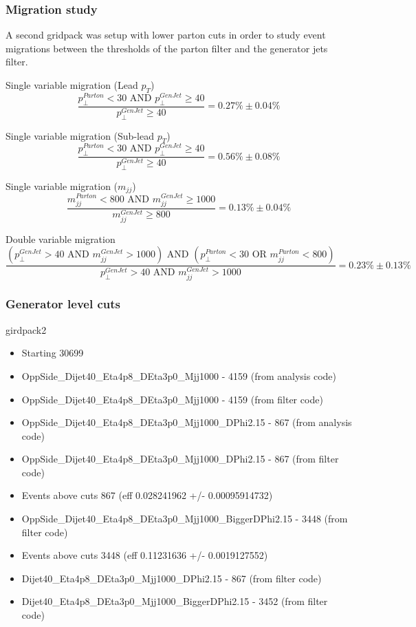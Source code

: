 \subsubsection{Migration study}

A second gridpack was setup with lower parton cuts in order to study event migrations between the thresholds of the parton filter and the generator jets filter.

Single variable migration (Lead $p_T$)
\begin{equation}
\frac{p_{\perp}^{Parton}<30 \text{ AND } p_{\perp}^{GenJet} \geq 40}{p_{\perp}^{GenJet} \geq 40}=0.27\% \pm 0.04\%
\end{equation}

Single variable migration (Sub-lead $p_T$)
\begin{equation}
\frac{p_{\perp}^{Parton}<30 \text{ AND } p_{\perp}^{GenJet} \geq 40}{p_{\perp}^{GenJet} \geq 40}=0.56\% \pm 0.08\%
\end{equation}

Single variable migration ($m_{jj}$)
\begin{equation}
\frac{m_{jj}^{Parton}<800 \text{ AND } m_{jj}^{GenJet} \geq 1000}{m_{jj}^{GenJet} \geq 800}=0.13\% \pm 0.04\%
\end{equation}

Double variable migration
\begin{equation}
\frac{(p_{\perp}^{GenJet}>40 \text{ AND } m_{jj}^{GenJet}>1000) \text{ AND } (p_{\perp}^{Parton}<30 \text{ OR } m_{jj}^{Parton}<800)}{p_{\perp}^{GenJet}>40 \text{ AND } m_{jj}^{GenJet}>1000} = 0.23\% \pm 0.13\%
\end{equation}

\subsubsection{Generator level cuts}

girdpack2
\begin{itemize}
  \item Starting 30699
  \item OppSide_Dijet40_Eta4p8_DEta3p0_Mjj1000          - 4159 (from analysis code)
  \item OppSide_Dijet40_Eta4p8_DEta3p0_Mjj1000          - 4159 (from filter code)
  \item OppSide_Dijet40_Eta4p8_DEta3p0_Mjj1000_DPhi2.15 - 867 (from analysis code)
  \item OppSide_Dijet40_Eta4p8_DEta3p0_Mjj1000_DPhi2.15 - 867 (from filter code)
  \item Events above cuts 867 (eff 0.028241962 +/- 0.00095914732)
  \item OppSide_Dijet40_Eta4p8_DEta3p0_Mjj1000_BiggerDPhi2.15 - 3448 (from filter code)
  \item Events above cuts 3448 (eff 0.11231636 +/- 0.0019127552)
  \item Dijet40_Eta4p8_DEta3p0_Mjj1000_DPhi2.15       - 867  (from filter code)
  \item Dijet40_Eta4p8_DEta3p0_Mjj1000_BiggerDPhi2.15 - 3452 (from filter code)
\end{itemize}

